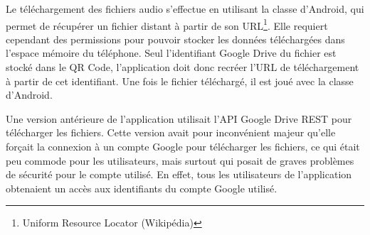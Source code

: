 \par
Le téléchargement des fichiers audio s'effectue en utilisant la classe  d'Android, qui permet de récupérer un fichier distant à partir de son URL\footnote{Uniform Resource Locator (Wikipédia)}. Elle requiert cependant des permissions pour pouvoir stocker les données téléchargées dans l'espace mémoire du téléphone. Seul l'identifiant Google Drive du fichier est stocké dans le QR Code, l'application doit donc recréer l'URL de téléchargement	à partir de cet identifiant. Une fois le fichier téléchargé, il est joué avec la classe  d'Android.\\

\par
Une version antérieure de l'application utilisait l'API Google Drive REST pour télécharger les fichiers. Cette version avait pour inconvénient majeur qu'elle forçait la connexion à un compte Google pour télécharger les fichiers, ce qui était peu commode pour les utilisateurs, mais surtout qui posait de graves problèmes de sécurité pour le compte utilisé. En effet, tous les utilisateurs de l'application obtenaient un accès aux identifiants du compte Google utilisé.